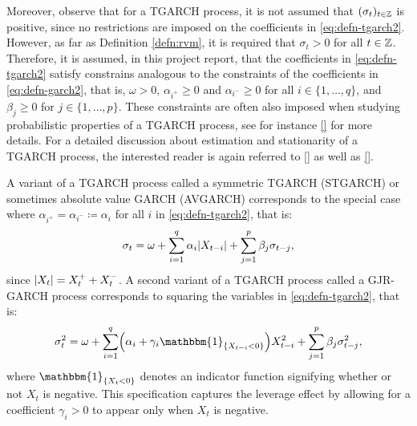 Moreover, observe that for a TGARCH process, it is not assumed that $(\sigma_{t})_{t\in\mathbb{Z}}$ is positive, since no restrictions are imposed on the coefficients in \eqref{eq:defn-tgarch2}. However, as far as Definition \ref{defn:rvm}, it is required that $\sigma_{t}>0$ for all $t\in\mathbb{Z}$. Therefore, it is assumed, in this project report, that the coefficients in \eqref{eq:defn-tgarch2} satisfy constrains analogous to the constraints of the coefficients in \eqref{eq:defn-garch2}, that is, $\omega>0$, $\alpha_{i^{+}}\geq0$ and $\alpha_{i^{-}}\geq0$ for all $i\in\{1,\dots,q\}$, and $\beta_{j}\geq0$ for $j\in\{1,\dots,p\}$. 
These constraints are often also imposed when studying probabilistic properties of a TGARCH process, see for instance \ref{} for more details. For a detailed discussion about estimation and stationarity of a TGARCH process, the interested reader is again referred to \ref{} as well as \ref{}. %





A variant of a TGARCH process called a symmetric TGARCH (STGARCH) or sometimes absolute value GARCH (AVGARCH) corresponds to the special case where $\alpha_{i^{+}}=\alpha_{i^{-}}\coloneqq\alpha_{i}$ for all $i$ in \eqref{eq:defn-tgarch2}, that is:
\begin{equation}
    \sigma_{t}=\omega+\sum_{i=1}^{q}\alpha_{i}\lvert X_{t-i}\rvert+\sum_{j=1}^{p}\beta_{j}\sigma_{t-j},
\end{equation}
since $\lvert X_{t}\rvert=X_{t}^{+}+X_{t}^{-}$. A second variant of a TGARCH process called a GJR-GARCH process corresponds to squaring the variables in \eqref{eq:defn-tgarch2}, that is:
\begin{equation}\label{eq:defn-gjrgarch}
    \sigma_{t}^{2}=\omega+\sum_{i=1}^{q}\left(\alpha_{i}+\gamma_{i}\mathbbm{1}_{\{X_{t-i}<0\}}\right)X_{t-i}^{2}+\sum_{j=1}^{p}\beta_{j}\sigma_{t-j}^{2},
\end{equation}
where $\mathbbm{1}_{\{X_{t}<0\}}$ denotes an indicator function signifying whether or not $X_{t}$ is negative. This specification captures the leverage effect by allowing for a coefficient $\gamma_{i}>0$ to appear only when $X_{t}$ is negative.


